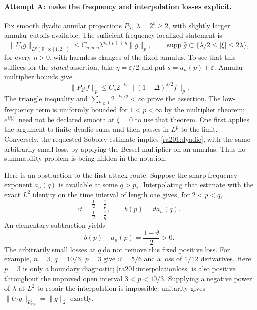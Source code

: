 \documentclass[11pt]{article}
\newcommand{\R}{\mathbb{R}}
\newcommand{\eps}{\varepsilon}
\begin{document}
	\paragraph{Attempt A: make the frequency and interpolation losses explicit.}
	Fix smooth dyadic annular projections $P_\lambda$, $\lambda=2^k\geq2$,
	with slightly larger annular cutoffs available. The sufficient
	frequency-localized statement is
	\begin{equation}\label{ra201:dyadic}
		\|U_t g\|_{L^p(\R^n\times[1,2])}
		\leq C_{n,p,\eta}\lambda^{a_n(p)+\eta}\|g\|_p,
		\qquad \operatorname{supp}\widehat g\subset
		\{\lambda/2\leq|\xi|\leq2\lambda\},
	\end{equation}
	for every $\eta>0$, with harmless changes of the fixed annulus. To see
	that this suffices for the \emph{stated} assertion, take
	$\eta=\eps/2$ and put $s=a_n(p)+\eps$. Annular multiplier bounds give
	\[
	\|P_{2^k}f\|_p\leq C_s2^{-ks}\|(1-\Delta)^{s/2}f\|_p.
	\]
	The triangle inequality and
	$\sum_{k\geq1}2^{-k\eps/2}<\infty$ prove the assertion. The low-frequency
	term is uniformly bounded for $1<p<\infty$ by the multiplier theorem;
	$e^{it|\xi|}$ need not be declared smooth at $\xi=0$ to use that theorem.
	One first applies the argument to finite dyadic sums and then passes in
	$L^p$ to the limit. Conversely, the requested Sobolev estimate implies
	\eqref{ra201:dyadic}, with the same arbitrarily small loss, by applying
	the Bessel multiplier on an annulus. Thus no summability problem is
	being hidden in the notation.
	
	Here is an obstruction to the first attack route. Suppose the sharp
	frequency exponent $a_n(q)$ is available at some $q>p_*$. Interpolating
	that estimate with the exact $L^2$ identity on the time interval of length
	one gives, for $2<p<q$,
	\[
	\vartheta=\frac{\frac12-\frac1p}{\frac12-\frac1q},\qquad
	b(p)=\vartheta a_n(q).
	\]
	An elementary subtraction yields
	\begin{equation}\label{ra201:interpolationloss}
		b(p)-a_n(p)=\frac{1-\vartheta}{2}>0.
	\end{equation}
	The arbitrarily small losses at $q$ do not remove this fixed positive
	loss. For example, $n=3$, $q=10/3$, $p=3$ give
	$\vartheta=5/6$ and a loss of $1/12$ derivatives. Here $p=3$ is only a
	boundary diagnostic; \eqref{ra201:interpolationloss} is also positive
	throughout the unproved open interval $3<p<10/3$. Supplying a negative
	power of $\lambda$ at $L^2$ to repair the interpolation is impossible:
	unitarity gives $\|U_tg\|_{L^2_{x,t}}=\|g\|_2$ exactly.
	
\end{document}
